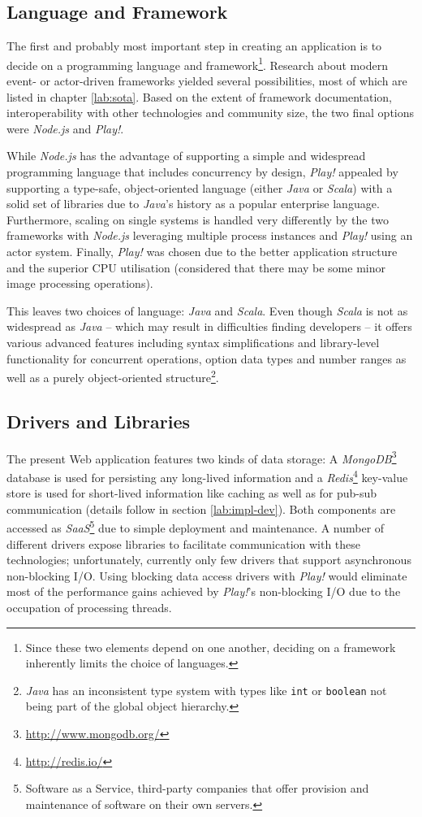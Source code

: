 \subsection{Language and Framework}
The first and probably most important step in creating an application is to decide on a programming language and framework\footnote{Since these two elements depend on one another, deciding on a framework inherently limits the choice of languages.}. Research about modern event- or actor-driven frameworks yielded several possibilities, most of which are listed in chapter \ref{lab:sota}. Based on the extent of framework documentation, interoperability with other technologies and community size, the two final options were \textit{Node.js} and \textit{Play!}. 

While \textit{Node.js} has the advantage of supporting a simple and widespread programming language that includes concurrency by design, \textit{Play!} appealed by supporting a type-safe, object-oriented language (either \textit{Java} or \textit{Scala}) with a solid set of libraries due to \textit{Java}'s history as a popular enterprise language. Furthermore, scaling on single systems is handled very differently by the two frameworks with \textit{Node.js} leveraging multiple process instances and \textit{Play!} using an actor system. Finally, \textit{Play!} was chosen due to the better application structure and the superior CPU utilisation (considered that there may be some minor image processing operations).

This leaves two choices of language: \textit{Java} and \textit{Scala}. Even though \textit{Scala} is not as widespread as \textit{Java} -- which may result in difficulties finding developers -- it offers various advanced features including syntax simplifications and library-level functionality for concurrent operations, option data types and number ranges as well as a purely object-oriented structure\footnote{\textit{Java} has an inconsistent type system with types like \texttt{int} or \texttt{boolean} not being part of the global object hierarchy.}. 

\subsection{Drivers and Libraries}
The present Web application features two kinds of data storage: A \textit{MongoDB}\footnote{\url{http://www.mongodb.org/}} database is used for persisting any long-lived information and a \textit{Redis}\footnote{\url{http://redis.io/}} key-value store is used for short-lived information like caching as well as for pub-sub communication (details follow in section \ref{lab:impl-dev}). Both components are accessed as \textit{SaaS}\footnote{Software as a Service, third-party companies that offer provision and maintenance of software on their own servers.} due to simple deployment and maintenance. A number of different drivers expose libraries to facilitate communication with these technologies; unfortunately, currently only few drivers that support asynchronous non-blocking I/O. Using blocking data access drivers with \textit{Play!} would eliminate most of the performance gains achieved by \textit{Play!}'s non-blocking I/O due to the occupation of processing threads. 

